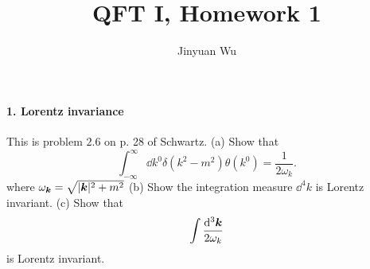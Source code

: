\documentclass[hyperref, a4paper]{article}
\title{QFT I, Homework 1}
\author{Jinyuan Wu}
\begin{document}
\maketitle

\paragraph{1. Lorentz invariance} This is problem $2.6$ on p. 28 of Schwartz.
(a) Show that
\begin{equation}
    \int_{-\infty}^{\infty} \dd k^{0} \delta\left(k^{2}-m^{2}\right) \theta\left(k^{0}\right)=\frac{1}{2 \omega_{k}}.
    \label{eq:sch-2.6-1}
\end{equation}
where $\omega_{\vb*{k}}=\sqrt{|\vb*{k}|^{2}+m^{2}}$
(b) Show the integration measure $\dd^{4} k$ is Lorentz invariant.
(c) Show that
\begin{equation}
    \int \frac{\dd^{3} \vb*{k}}{2 \omega_{k}}
    \label{eq:sch-2.6-2}
\end{equation}
is Lorentz invariant.
\end{document}
